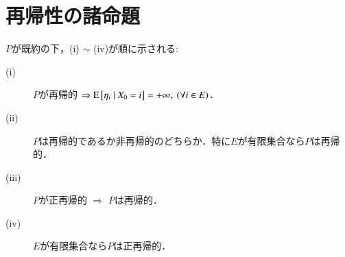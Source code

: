 \section{再帰性の諸命題}
	\begin{prp}
		$P$が既約の下，(i) $\sim$ (iv)が順に示される:
		\begin{description}
			\item[\rm{(i)}] $P$が再帰的 $\Rightarrow \operatorname{E} \left[ \eta_i \ \middle|\ X_0 = i \right] = +\infty, \ (\forall i \in E)$．
			\item[\rm{(ii)}] $P$は再帰的であるか非再帰的のどちらか．特に$E$が有限集合なら$P$は再帰的．
			\item[\rm{(iii)}] $P$が正再帰的 $\Rightarrow$ $P$は再帰的．
			\item[\rm{(iv)}] $E$が有限集合なら$P$は正再帰的．
		\end{description}
	\end{prp}

